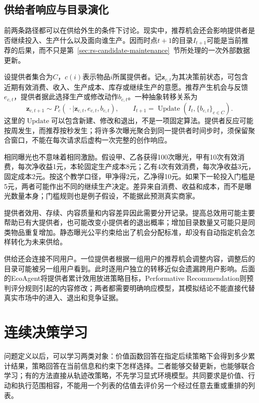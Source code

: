 \subsection{供给者响应与目录演化}
\label{sec:rs-provider-dynamics}

前两条路径都可以在供给外生的条件下讨论。现实中，推荐机会还会影响提供者是否继续投入、生产什么以及面向谁生产。因而时点$t+1$的目录$I_{t+1}$可能是当前推荐的后果，而不只是第~\ref{sec:rs-candidate-maintenance}~节所处理的一次外部数据更新。

设提供者集合为$C$，$c(i)$表示物品$i$所属提供者。记$\bm{z}_{c,t}$为其决策前状态，可包含近期有效消费、收入、生产成本、库存或继续生产的意愿。推荐产生机会与反馈$e_{c,t}$，提供者据此选择生产或修改动作$b_{c,t}$。一种抽象转移关系为
\[
 \bm{z}_{c,t+1}\sim
 P_c(\,\cdot\mid\bm{z}_{c,t},e_{c,t},b_{c,t}),
 \qquad
 I_{t+1}=\operatorname{Update}(I_t,\{b_{c,t}\}_{c\in C}).
\]
这里的$\operatorname{Update}$可以包含新建、修改和退出，不是一项固定算法。提供者反应可能按周发生，而推荐按秒发生；将许多次曝光聚合到同一提供者时间步时，须保留聚合窗口，不能在每次请求后虚构一次完整的创作响应。

相同曝光也不意味着相同激励。假设甲、乙各获得100次曝光，甲有10次有效消费，每次净收益1元，本轮固定生产成本8元；乙有4次有效消费，每次净收益3元，固定成本2元。按这个教学口径，甲净得2元，乙净得10元。如果下一轮投入门槛是5元，两者可能作出不同的继续生产决定。差异来自消费、收益和成本，而不是曝光数量本身；门槛规则也是例子假设，不能据此预测真实商家。

提供者效用、存续、内容质量和内容差异因此需要分开记录。提高总效用可能主要帮助已有大提供者，也可能改变小提供者的退出概率；增加目录数量又可能只是同类物品重复增加。静态曝光公平约束给出了机会分配标准，却没有自动指定机会怎样转化为未来供给。

供给还会连接不同用户。一位提供者根据一组用户的推荐机会调整内容，调整后的目录可能被另一组用户看到。此时逐用户独立的转移近似会遗漏跨用户影响。后面的EcoAgent将提供者累计效用放进策略目标，Performative Recommendation则预判评分规则引起的内容修改；两者都需要明确响应模型，其模拟结论不能直接代替真实市场中的进入、退出和竞争证据。

\section{连续决策学习}
\label{sec:rs-sequential-learning}

问题定义以后，可以学习两类对象：价值函数回答在指定后续策略下会得到多少累计结果，策略回答在当前信息和约束下怎样选择。二者能够交替更新，也能够联合学习；有的方法直接从轨迹改策略，不先学习显式环境模型。共同要求是价值、行动和执行范围相容，不能用一个列表的估值去评价另一个经过任意去重或重排的列表。

